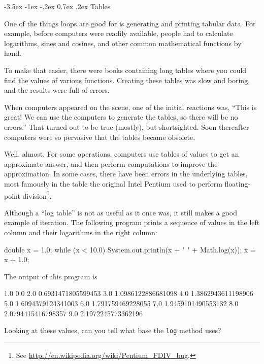 \documentclass{book}
\makeatletter
\renewcommand{\section}{\@startsection 
    {section} {1} {0mm}%
    {-3.5ex \@plus -1ex \@minus -.2ex}%
    {0.7ex \@plus.2ex}%
    {\normalfont\Large\bfseries}}
\makeatother
\begin{document}
\section{Tables}

One of the things loops are good for is generating and printing
tabular data.  For example, before computers were readily
available, people had to calculate logarithms,
sines and cosines, and other common mathematical functions
by hand.

To make that easier, there were books containing long tables
where you could find the values of various functions.
Creating these tables was slow and boring, and the results
were full of errors.

When computers appeared on the scene, one of the initial reactions
was, ``This is great!  We can use the computers to generate the
tables, so there will be no errors.''  That turned out to be true
(mostly), but shortsighted.  Soon thereafter computers were so
pervasive that the tables became obsolete.

Well, almost.  For some operations, computers use tables of values to
get an approximate answer, and then perform computations to improve
the approximation.  In some cases, there have been errors in the
underlying tables, most famously in the table the original Intel
Pentium used to perform floating-point division\footnote{See
  \url{http://en.wikipedia.org/wiki/Pentium_FDIV_bug}.}.


Although a ``log table'' is not as useful as it once was, it still
makes a good example of iteration.  The following program prints a
sequence of values in the left column and their logarithms in the
right column:

\begin{verbatimtab}
    double x = 1.0;
    while (x < 10.0) {
      System.out.println(x + "   " + Math.log(x));
      x = x + 1.0;
    }
\end{verbatimtab}
%
The output of this program is

\begin{verbatimtab}
1.0   0.0
2.0   0.6931471805599453
3.0   1.0986122886681098
4.0   1.3862943611198906
5.0   1.6094379124341003
6.0   1.791759469228055
7.0   1.9459101490553132
8.0   2.0794415416798357
9.0   2.1972245773362196
\end{verbatimtab}
%
Looking at these values, can you tell what base the {\tt log}
method uses?
\end{document}
